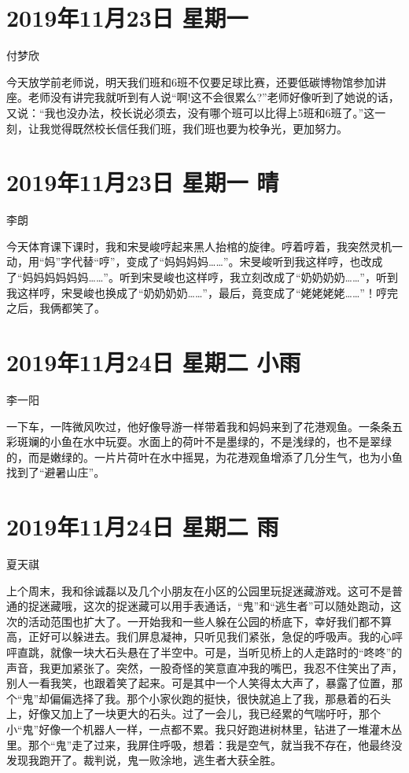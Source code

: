 \section{2019年11月23日 星期一}

付梦欣

今天放学前老师说，明天我们班和6班不仅要足球比赛，还要低碳博物馆参加讲座。老师没有讲完我就听到有人说``啊!这不会很累么?''老师好像听到了她说的话，又说：``我也没办法，校长说必须去，没有哪个班可以比得上5班和6班了。''这一刻，让我觉得既然校长信任我们班，我们班也要为校争光，更加努力。

\section{2019年11月23日 星期一 晴}

李朗

今天体育课下课时，我和宋旻峻哼起来黑人抬棺的旋律。哼着哼着，我突然灵机一动，用``妈''字代替``哼''，变成了``妈妈妈妈\ldots\ldots{}''。宋旻峻听到我这样哼，也改成了``妈妈妈妈妈妈\ldots\ldots{}''。听到宋旻峻也这样哼，我立刻改成了``奶奶奶奶\ldots\ldots{}''，听到我这样哼，宋旻峻也换成了``奶奶奶奶\ldots\ldots{}''，最后，竟变成了``姥姥姥姥\ldots\ldots{}''！哼完之后，我俩都笑了。

\section{2019年11月24日 星期二 小雨}

李一阳

一下车，一阵微风吹过，他好像导游一样带着我和妈妈来到了花港观鱼。一条条五彩斑斓的小鱼在水中玩耍。水面上的荷叶不是墨绿的，不是浅绿的，也不是翠绿的，而是嫩绿的。一片片荷叶在水中摇晃，为花港观鱼增添了几分生气，也为小鱼找到了``避暑山庄''。

\section{2019年11月24日 星期二 雨}

夏天祺

上个周末，我和徐诚磊以及几个小朋友在小区的公园里玩捉迷藏游戏。这可不是普通的捉迷藏哦，这次的捉迷藏可以用手表通话，``鬼''和``逃生者''可以随处跑动，这次的活动范围也扩大了。一开始我和一些人躲在公园的桥底下，幸好我们都不算高，正好可以躲进去。我们屏息凝神，只听见我们紧张，急促的呼吸声。我的心呯呯直跳，就像一块大石头悬在了半空中。可是，当听见桥上的人走路时的``咚咚''的声音，我更加紧张了。突然，一股奇怪的笑意直冲我的嘴巴，我忍不住笑出了声，别人一看我笑，也跟着笑了起来。可是其中一个人笑得太大声了，暴露了位置，那个``鬼''却偏偏选择了我。那个小家伙跑的挺快，很快就追上了我，那悬着的石头上，好像又加上了一块更大的石头。过了一会儿，我已经累的气喘吁吁，那个小``鬼''好像一个机器人一样，一点都不累。我只好跑进树林里，钻进了一堆灌木丛里。那个``鬼''走了过来，我屏住呼吸，想着：我是空气，就当我不存在，他最终没发现我跑开了。裁判说，鬼一败涂地，逃生者大获全胜。

